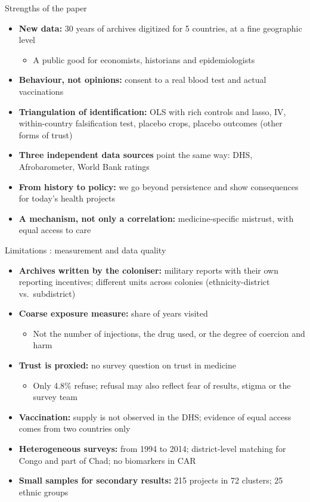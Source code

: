 \documentclass[aspectratio=1610]{beamer}
\begin{document}
\begin{frame}{Strengths of the paper}
  \begin{itemize}
    \item \textbf{New data:} 30 years of archives digitized for 5 countries, at a fine geographic level
      \begin{itemize}
        \item A public good for economists, historians and epidemiologists
      \end{itemize}
    \item \textbf{Behaviour, not opinions:} consent to a real blood test and actual vaccinations
    \item \textbf{Triangulation of identification:} OLS with rich controls and lasso, IV,
      within-country falsification test, placebo crops, placebo outcomes (other forms of trust)
    \item \textbf{Three independent data sources} point the same way:
      DHS, Afrobarometer, World Bank ratings
    \item \textbf{From history to policy:} we go beyond persistence and show consequences for
      today's health projects
    \item \textbf{A mechanism, not only a correlation:} medicine-specific mistrust, with equal access to care
  \end{itemize}
\end{frame}

\begin{frame}{Limitations : measurement and data quality}
  \begin{itemize}
    \item \textbf{Archives written by the coloniser:} military reports with their own reporting
      incentives; different units across colonies (ethnicity-district vs.\ subdistrict)
    \item \textbf{Coarse exposure measure:} share of years visited
      \begin{itemize}
        \item Not the number of injections, the drug used, or the degree of coercion and harm
      \end{itemize}
    \item \textbf{Trust is proxied:} no survey question on trust in medicine
      \begin{itemize}
        \item Only 4.8\% refuse; refusal may also reflect fear of results, stigma or the survey team
      \end{itemize}
    \item \textbf{Vaccination:} supply is not observed in the DHS; evidence of equal access comes from
      two countries only
    \item \textbf{Heterogeneous surveys:} from 1994 to 2014; district-level matching for Congo and part of
      Chad; no biomarkers in CAR
    \item \textbf{Small samples for secondary results:} 215 projects in 72 clusters; 25 ethnic groups
  \end{itemize}
\end{frame}
\end{document}
